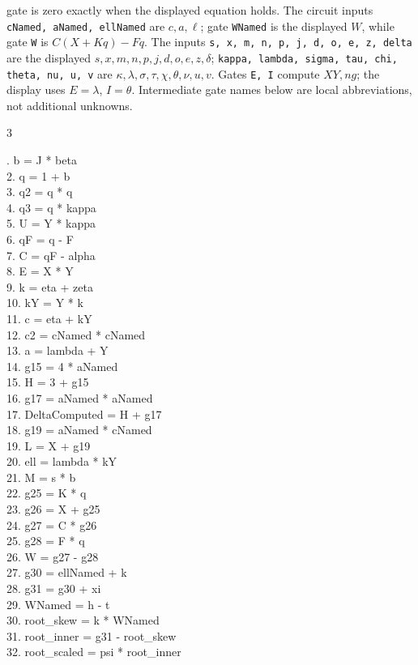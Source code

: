 \documentclass[10pt]{article}
\begin{document}
gate is zero exactly when the displayed equation holds. The circuit inputs
\texttt{cNamed, aNamed, ellNamed} are $c,a,\ell$; gate \texttt{WNamed} is the
displayed $W$, while gate \texttt{W} is $C(X+Kq)-Fq$. The inputs
\texttt{s, x, m, n, p, j, d, o, e, z, delta} are the displayed
$s,x,m,n,p,j,d,o,e,z,\delta$; \texttt{kappa, lambda, sigma, tau, chi, theta, nu, u, v}
are $\kappa,\lambda,\sigma,\tau,\chi,\theta,\nu,u,v$. Gates \texttt{E, I} compute
$XY,ng$; the display uses $E=\lambda$, $I=\theta$. Intermediate gate
names below are local abbreviations, not additional unknowns.
\begin{multicols}{3}
\raggedright\ttfamily\fontsize{7.2}{8.4}. b = J * beta\\
2. q = 1 + b\\
3. q2 = q * q\\
4. q3 = q * kappa\\
5. U = Y * kappa\\
6. qF = q - F\\
7. C = qF - alpha\\
8. E = X * Y\\
9. k = eta + zeta\\
10. kY = Y * k\\
11. c = eta + kY\\
12. c2 = cNamed * cNamed\\
13. a = lambda + Y\\
14. g15 = 4 * aNamed\\
15. H = 3 + g15\\
16. g17 = aNamed * aNamed\\
17. DeltaComputed = H + g17\\
18. g19 = aNamed * cNamed\\
19. L = X + g19\\
20. ell = lambda * kY\\
21. M = s * b\\
22. g25 = K * q\\
23. g26 = X + g25\\
24. g27 = C * g26\\
25. g28 = F * q\\
26. W = g27 - g28\\
27. g30 = ellNamed + k\\
28. g31 = g30 + xi\\
29. WNamed = h - t\\
30. root\_skew = k * WNamed\\
31. root\_inner = g31 - root\_skew\\
32. root\_scaled = psi * root\_inner\\

\end{multicols}
\end{document}

